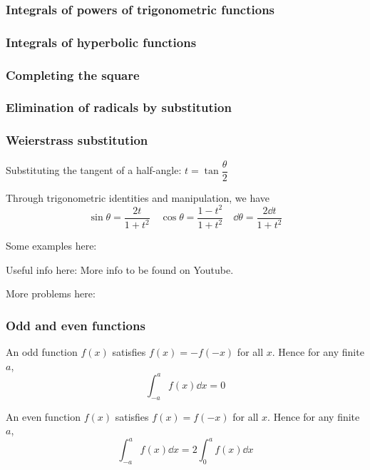 \subsubsection{Integrals of powers of trigonometric functions}

\subsubsection{Integrals of hyperbolic functions}

\subsubsection{Completing the square}

\subsubsection{Elimination of radicals by substitution}

\subsubsection{Weierstrass substitution}
Substituting the tangent of a half-angle: $t=\tan\dfrac{\theta}{2}$

Through trigonometric identities and manipulation, we have
\[ \sin\theta = \frac{2t}{1+t^2} \quad \cos\theta = \frac{1-t^2}{1+t^2} \quad \dd{\theta} = \frac{2\dd{t}}{1+t^2} \]

Some examples here: %

Useful info here:
More info to be found on Youtube.

More problems here: %

\subsubsection{Odd and even functions}
An odd function $f(x)$ satisfies $f(x)=-f(-x)$ for all $x$. Hence for any finite $a$,
\[ \int_{-a}^a f(x)\dd{x} = 0 \]

An even function $f(x)$ satisfies $f(x)=f(-x)$ for all $x$. Hence for any finite $a$,
\[ \int_{-a}^a f(x)\dd{x} = 2\int_0^a f(x)\dd{x} \]


